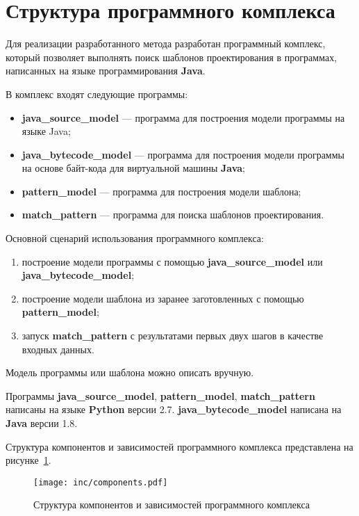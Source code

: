 \section{Структура программного комплекса}

Для реализации разработанного метода разработан программный комплекс,
который позволяет выполнять поиск шаблонов проектирования в программах,
написанных на языке программирования \textbf{Java}.

В комплекс входят следующие программы:
\begin{itemize}
\item \textbf{java\_source\_model} --- программа для построения модели программы
на языке Java;
\item \textbf{java\_bytecode\_model} --- программа для построения модели программы
на основе байт-кода для виртуальной машины \textbf{Java};
\item \textbf{pattern\_model} --- программа для построения модели шаблона;
\item \textbf{match\_pattern} --- программа для поиска шаблонов проектирования.
\end{itemize}

Основной сценарий использования программного комплекса:
\begin{enumerate}
\item построение модели программы с помощью \textbf{java\_source\_model} или \textbf{java\_bytecode\_model};
\item построение модели шаблона из заранее заготовленных с помощью \textbf{pattern\_model};
\item запуск \textbf{match\_pattern} с результатами первых двух шагов в качестве входных данных.
\end{enumerate}

Модель программы или шаблона можно описать вручную.

Программы \textbf{java\_source\_model}, \textbf{pattern\_model},
\textbf{match\_pattern} написаны на языке \textbf{Python} версии 2.7.
\textbf{java\_bytecode\_model} написана на \textbf{Java} версии 1.8.

Структура компонентов и зависимостей программного комплекса представлена на
рисунке~\ref{fig:components}.

\begin{figure}[!ht]
\centering
\texttt{[image: inc/components.pdf]}
\caption{Структура компонентов и зависимостей программного комплекса}
\label{fig:components}
\end{figure}

